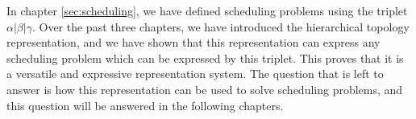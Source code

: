 In chapter \ref{sec:scheduling}, we have defined scheduling problems using the triplet $\alpha | \beta | \gamma$. Over the past three chapters, we have introduced the hierarchical topology representation, and we have shown that this representation can express any scheduling problem which can be expressed by this triplet. This proves that it is a versatile and expressive representation system. The question that is left to answer is how this representation can be used to solve scheduling problems, and this question will be answered in the following chapters.